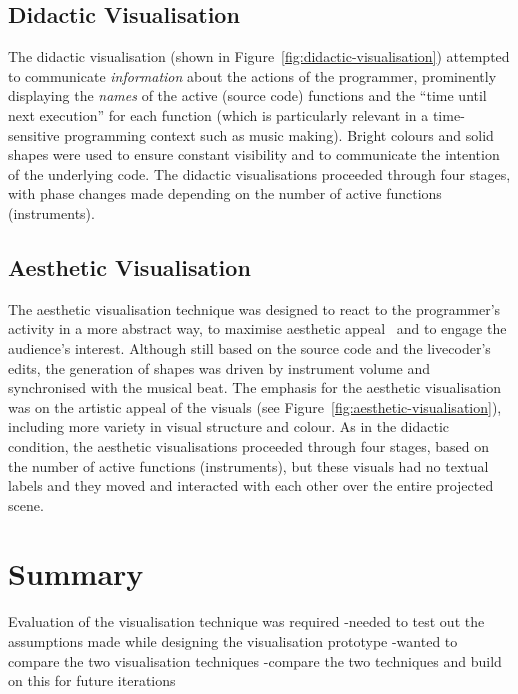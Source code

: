\subsection{Didactic Visualisation}
\label{sec:didactic-visualisation}

The didactic visualisation (shown in Figure~\ref{fig:didactic-visualisation}) attempted to communicate \emph{information} about the actions of the programmer, prominently displaying the \emph{names} of the active (source code) functions and the ``time until next execution'' for each function (which is particularly relevant in a time-sensitive programming context such as music making). Bright colours and solid shapes were used to ensure constant visibility and to communicate the intention of the underlying code. The didactic visualisations proceeded through four stages, with phase changes made depending on the number of active functions (instruments).

\subsection{Aesthetic Visualisation}
\label{sec:aesthetic-visualisation}

The aesthetic visualisation technique was designed to react to the programmer's activity in a more abstract way, to maximise aesthetic appeal~\cite{Cawthon2007} and to engage the audience's interest. Although still based on the source code and the livecoder's edits, the generation of shapes was driven by instrument volume and synchronised with the musical beat. The emphasis for the aesthetic visualisation was on the artistic appeal of the visuals (see Figure~\ref{fig:aesthetic-visualisation}), including more variety in visual structure and colour. As in the didactic condition, the aesthetic visualisations proceeded through four stages, based on the number of active functions (instruments), but these visuals had no textual labels and they moved and interacted with each other over the entire projected scene.

\section{Summary}

Evaluation of the visualisation technique was required 
-needed to test out the assumptions made while designing the visualisation prototype
-wanted to compare the two visualisation techniques
-compare the two techniques and build on this for future iterations



